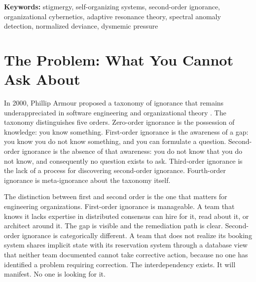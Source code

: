 \documentclass[11pt,a4paper]{article}
\begin{document}
\begin{abstract}
Beyond the Discovery quadrant---where hidden interdependencies are surfaced---the paper formalizes a four-quadrant model that includes Normalized Deviance detection, where known risks are discussed but not acted upon, and the decay path by which surfaced findings migrate from discovery to normalized deviance through dysmemic absorption. A formal scoring function prioritizes findings by topological bridge distance, entity confidence, risk coupling, and communicability. The mesh is shown to satisfy the three properties of a Mirror---insulation, access, and authority---required for observation outside local selection pressure. A reference implementation with comprehensive test coverage demonstrates the architecture's feasibility. The system operates as a prosthetic for organizational perception: it sees what the organization cannot see about itself, because operationally closed systems cannot observe the conditions of their own observation.
\end{abstract}

\medskip
\noindent\textbf{Keywords:} stigmergy, self-organizing systems, second-order ignorance, organizational cybernetics, adaptive resonance theory, spectral anomaly detection, normalized deviance, dysmemic pressure

\section{The Problem: What You Cannot Ask About}
\label{sec:problem}

In 2000, Phillip Armour proposed a taxonomy of ignorance that remains underappreciated in software engineering and organizational theory \citep{armour2000}. The taxonomy distinguishes five orders. Zero-order ignorance is the possession of knowledge: you know something. First-order ignorance is the awareness of a gap: you know you do not know something, and you can formulate a question. Second-order ignorance is the absence of that awareness: you do not know that you do not know, and consequently no question exists to ask. Third-order ignorance is the lack of a process for discovering second-order ignorance. Fourth-order ignorance is meta-ignorance about the taxonomy itself.

The distinction between first and second order is the one that matters for engineering organizations. First-order ignorance is manageable. A team that knows it lacks expertise in distributed consensus can hire for it, read about it, or architect around it. The gap is visible and the remediation path is clear. Second-order ignorance is categorically different. A team that does not realize its booking system shares implicit state with its reservation system through a database view that neither team documented cannot take corrective action, because no one has identified a problem requiring correction. The interdependency exists. It will manifest. No one is looking for it.
\end{document}
